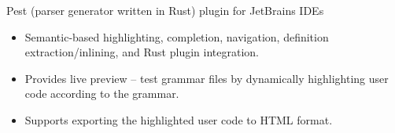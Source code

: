 \documentclass{resume}
\begin{document}



Pest (parser generator written in Rust) plugin for JetBrains IDEs
\begin{itemize}
  \item Semantic-based highlighting, completion, navigation, definition extraction/inlining, and Rust plugin integration.
  \item Provides live preview -- test grammar files by dynamically highlighting user code according to the grammar.
  \item Supports exporting the highlighted user code to HTML format.
\end{itemize}
\end{document}
